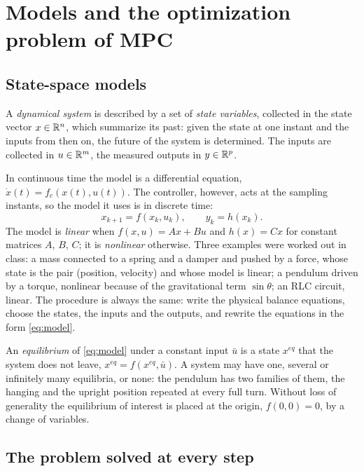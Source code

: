 \section{Models and the optimization problem of MPC}
\label{sec:problem}

\subsection{State-space models}

A \emph{dynamical system} is described by a set of \emph{state variables}, collected in the state
vector $x \in \mathbb{R}^n$, which summarize its past: given the state at one instant and the inputs from
then on, the future of the system is determined. The inputs are collected in $u \in \mathbb{R}^m$, the
measured outputs in $y \in \mathbb{R}^p$.

In continuous time the model is a differential equation, $\dot x(t) = f_c(x(t), u(t))$. The
controller, however, acts at the sampling instants, so the model it uses is in discrete time:
\begin{equation}
  x_{k+1} = f(x_k, u_k), \qquad y_k = h(x_k).
  \label{eq:model}
\end{equation}
The model is \emph{linear} when $f(x,u) = Ax + Bu$ and $h(x) = Cx$ for constant matrices $A$,
$B$, $C$; it is \emph{nonlinear} otherwise. Three examples were worked out in class: a mass
connected to a spring and a damper and pushed by a force, whose state is the pair (position,
velocity) and whose model is linear; a pendulum driven by a torque, nonlinear because of the
gravitational term $\sin\theta$; an RLC circuit, linear. The procedure is always the same: write
the physical balance equations, choose the states, the inputs and the outputs, and rewrite the
equations in the form \eqref{eq:model}.

An \emph{equilibrium} of \eqref{eq:model} under a constant input $\bar u$ is a state $x^{eq}$
that the system does not leave, $x^{eq} = f(x^{eq}, \bar u)$. A system may have one, several or
infinitely many equilibria, or none: the pendulum has two families of them, the hanging and the
upright position repeated at every full turn. Without loss of generality the equilibrium of
interest is placed at the origin, $f(0,0) = 0$, by a change of variables.

\subsection{The problem solved at every step}


